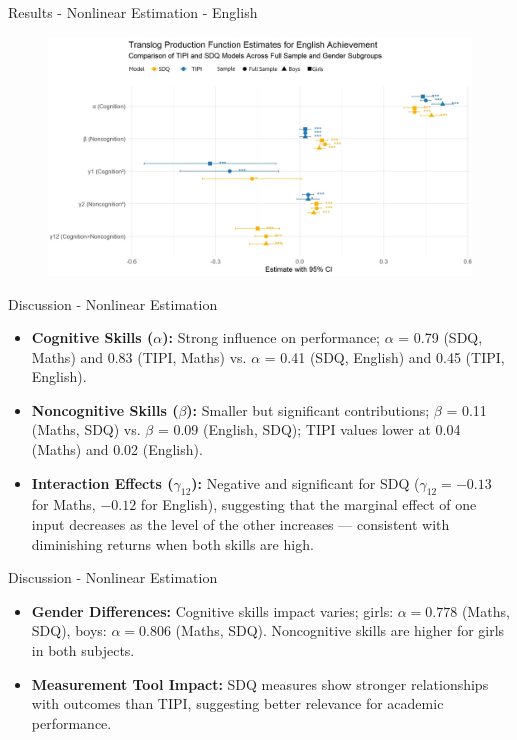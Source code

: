 \documentclass{beamer}
\begin{document}
\begin{frame}{Results - Nonlinear Estimation - English}

\begin{figure}[h!]
    \centering
    \includegraphics[width=1\linewidth]{English_Translog_Results.JPG}
    \label{fig:your_label}
\end{figure}
    \end{frame}


\begin{frame}{Discussion - Nonlinear Estimation}
\small
\begin{itemize}
    \item \textbf{Cognitive Skills ($\alpha$):} Strong influence on performance; $\alpha$ = 0.79 (SDQ, Maths) and 0.83 (TIPI, Maths) vs. $\alpha$ = 0.41 (SDQ, English) and 0.45 (TIPI, English). 
    \item \textbf{Noncognitive Skills ($\beta$):} Smaller but significant contributions; $\beta$ = 0.11 (Maths, SDQ) vs. $\beta$ = 0.09 (English, SDQ); TIPI values lower at 0.04 (Maths) and 0.02 (English).
    \item \textbf{Interaction Effects ($\gamma_{12}$):} Negative and significant for SDQ ($\gamma_{12} = -0.13$ for Maths, $-0.12$ for English), suggesting that the marginal effect of one input decreases as the level of the other increases — consistent with diminishing returns when both skills are high.
\end{itemize}
\end{frame}   

\begin{frame}{Discussion - Nonlinear Estimation}    
\begin{itemize}
    \item \textbf{Gender Differences:} Cognitive skills impact varies; girls: $\alpha = 0.778$ (Maths, SDQ), boys: $\alpha = 0.806$ (Maths, SDQ). Noncognitive skills are higher for girls in both subjects.
    \item \textbf{Measurement Tool Impact:} SDQ measures show stronger relationships with outcomes than TIPI, suggesting better relevance for academic performance.
\end{itemize}
\end{frame}
\end{document}
